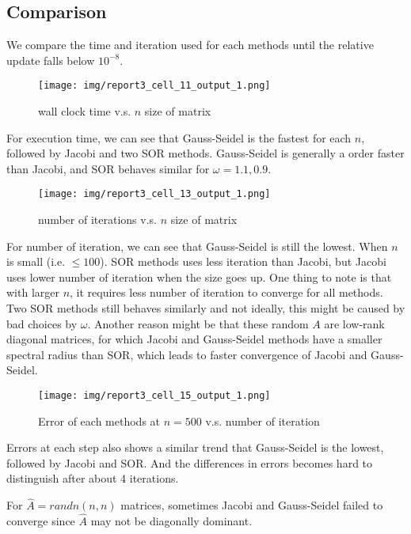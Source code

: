 \documentclass[a4paper,12pt]{article}
\begin{document}
\subsection{Comparison}

We compare the time and iteration used for each methods until the relative update falls below $10^{-8}$.
\begin{figure}[H]
    \centering
    \texttt{[image: img/report3\_cell\_11\_output\_1.png]}
    \caption{wall clock time v.s. $n$ size of matrix}
    \label{fig:0}   
\end{figure}

For execution time,
we can see that Gauss-Seidel is the fastest for each $n$,
followed by Jacobi and two SOR methods.
Gauss-Seidel is generally a order faster than Jacobi,
and SOR behaves similar for $\omega = 1.1, 0.9$.

\begin{figure}[H]
    \centering
    \texttt{[image: img/report3\_cell\_13\_output\_1.png]}
    \caption{number of iterations v.s. $n$ size of matrix}
    \label{fig:1}   
\end{figure}

For number of iteration,
we can see that Gauss-Seidel is still the lowest.
When $n$ is small (i.e. $\leq 100$). SOR methods uses less iteration than Jacobi,
but Jacobi uses lower number of iteration when the size goes up.
One thing to note is that with larger $n$,
it requires less number of iteration to converge for all methods.
Two SOR methods still behaves similarly and not ideally,
this might be caused by bad choices by $\omega$.
Another reason might be that these random $A$ are low-rank diagonal matrices,
for which Jacobi and Gauss-Seidel methods have a smaller spectral radius than SOR,
which leads to faster convergence of Jacobi and Gauss-Seidel.

\begin{figure}[H]
    \centering
    \texttt{[image: img/report3\_cell\_15\_output\_1.png]}
    \caption{Error of each methods at $n = 500$ v.s. number of iteration}
    \label{fig:2}   
\end{figure}

Errors at each step also shows a similar trend that Gauss-Seidel is the lowest,
followed by Jacobi and SOR.
And the differences in errors becomes hard to distinguish after about 4 iterations.

For $\hat{A} = randn(n, n)$ matrices,
sometimes Jacobi and Gauss-Seidel failed to converge since $\hat{A}$ may not be diagonally dominant.
\end{document}
